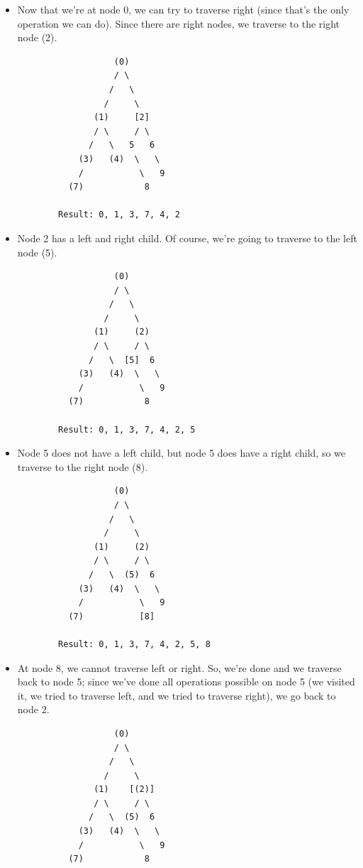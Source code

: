 \documentclass[letterpaper]{article}
\begin{document}
\begin{itemize}
\begin{verbatim}
        Result: 0, 1, 3, 7, 4
    \end{verbatim}

    \item Now that we're at node 0, we can try to traverse right (since that's the only operation we can do). Since there are right nodes, we traverse to the right node (2). 
    \begin{verbatim}
                   (0)
                   / \
                  /   \
                 /     \
               (1)     [2] 
               / \     / \ 
              /   \   5   6
            (3)   (4)  \   \ 
            /           \   9
          (7)            8

        Result: 0, 1, 3, 7, 4, 2
    \end{verbatim}

    \item Node 2 has a left and right child. Of course, we're going to traverse to the left node (5). 
    \begin{verbatim}
                   (0)
                   / \
                  /   \
                 /     \
               (1)     (2)
               / \     / \ 
              /   \  [5]  6
            (3)   (4)  \   \ 
            /           \   9
          (7)            8

        Result: 0, 1, 3, 7, 4, 2, 5
    \end{verbatim}

    \item Node 5 does not have a left child, but node 5 does have a right child, so we traverse to the right node (8). 
    \begin{verbatim}
                   (0)
                   / \
                  /   \
                 /     \
               (1)     (2)
               / \     / \ 
              /   \  (5)  6
            (3)   (4)  \   \ 
            /           \   9
          (7)           [8]

        Result: 0, 1, 3, 7, 4, 2, 5, 8
    \end{verbatim}

    \item At node 8, we cannot traverse left or right. So, we're done and we traverse back to node 5; since we've done all operations possible on node 5 (we visited it, we tried to traverse left, and we tried to traverse right), we go back to node 2. 
    \begin{verbatim}
                   (0)
                   / \
                  /   \
                 /     \
               (1)    [(2)]
               / \     / \ 
              /   \  (5)  6
            (3)   (4)  \   \ 
            /           \   9
          (7)            8


\end{verbatim}
\end{itemize}
\end{document}
